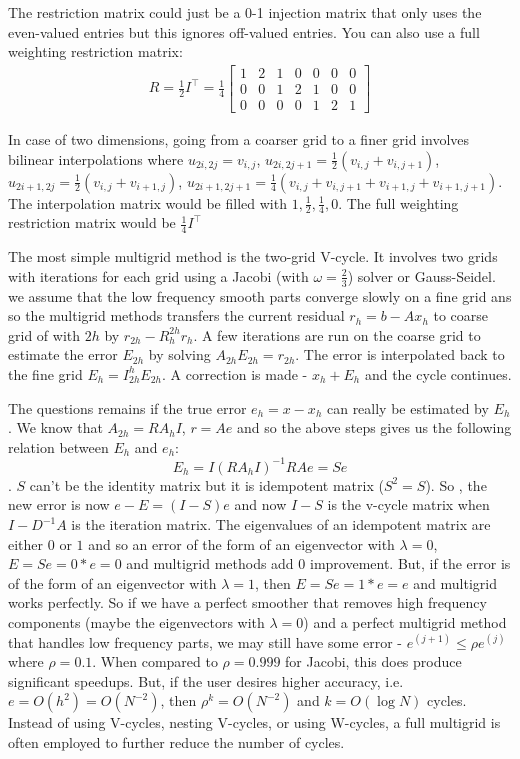 \documentclass[12pt]{article}
\begin{document}
The restriction matrix could just be a 0-1 injection matrix that only uses the even-valued entries but this ignores off-valued entries. You can also use a full weighting restriction matrix:
\begin{align*}
    R = \frac{1}{2}I^{\top} = \frac{1}{4} \begin{bmatrix}
        1 & 2 & 1 & 0 & 0 & 0 & 0 \\
        0 & 0 & 1 & 2 & 1 & 0 & 0 \\
        0 & 0 & 0 & 0 & 1 & 2 & 1 
    \end{bmatrix}
\end{align*}

In case of two dimensions, going from a coarser grid to a finer grid involves bilinear interpolations where $u_{2i, 2j} = v_{i, j}$, $u_{2i, 2j + 1} = \frac{1}{2}(v_{i, j} + v_{i, j + 1})$, $u_{2i + 1, 2j} = \frac{1}{2}(v_{i, j} + v_{i + 1, j})$, $u_{2i + 1, 2j + 1} = \frac{1}{4}(v_{i, j} + v_{i, j + 1} + v_{i + 1, j} + v_{i + 1, j + 1})$. The interpolation matrix would be filled with $1, \frac{1}{2}, \frac{1}{4}, 0$. The full weighting restriction matrix would be $\frac{1}{4}I^{\top}$

The most simple multigrid method is the two-grid V-cycle. It involves two grids with iterations for each grid using a Jacobi (with $\omega = \frac{2}{3}$) solver or Gauss-Seidel. we assume that the low frequency smooth parts converge slowly on a fine grid ans so the multigrid methods transfers the current residual $r_h = b - Ax_h$ to coarse grid of with $2h$ by $r_{2h} - R_h^{2h}r_h$. A few iterations are run on the coarse grid to estimate the error $E_{2h}$ by solving $A_{2h}E_{2h} = r_{2h}$. The error is interpolated back to the fine grid $E_h = I^h_{2h}E_{2h}$. A correction is made - $x_h + E_h$ and the cycle continues.

The questions remains if the true error $e_h = x - x_h$ can really be estimated by $E_h$. We know that $A_{2h} = RA_{h}I$, $r = Ae$ and so the above steps gives us the following relation between $E_h$ and $e_h$:
$$E_h = I(RA_hI)^{-1}RAe = Se$$. $S$ can't be the identity matrix but it is idempotent matrix ($S^2 = S$). So , the new error is now $e - E = (I - S)e$ and now $I - S$ is the v-cycle matrix when $I - D^{-1}A$ is the iteration matrix. The eigenvalues of an idempotent matrix are either $0$ or $1$ and so an error of the form of an eigenvector with $\lambda = 0$, $E = Se = 0*e = 0$ and multigrid methods add $0$ improvement. But, if the error is of the form of an eigenvector with $\lambda = 1$, then  $E = Se = 1*e = e$ and multigrid works perfectly. So if we have a perfect smoother that removes high frequency components (maybe the eigenvectors with $\lambda = 0$) and a perfect multigrid method that handles low frequency parts, we may still have some error - $e^{(j + 1)} \leq \rho e^{(j)}$ where $\rho = 0.1$. When compared to $\rho = 0.999$ for Jacobi, this does produce significant speedups. But, if the user desires higher accuracy, i.e. $e = O(h^2) = O(N^{-2})$, then $\rho^k = O(N^{-2})$ and $k = O(\log N)$ cycles. Instead of using V-cycles, nesting V-cycles, or using W-cycles, a full multigrid is often employed to further reduce the number of cycles. 
\end{document}
